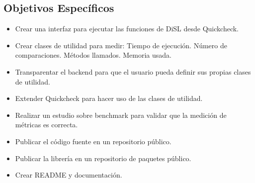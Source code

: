 \subsection*{Objetivos Específicos}\label{sec:obj-e}
\begin{itemize}
\item Crear una interfaz para ejecutar las funciones de DiSL desde Quickcheck.
\item Crear clases de utilidad para medir:
\subitem Tiempo de ejecución.
\subitem Número de comparaciones.
\subitem Métodos llamados.
\subitem Memoria usada.
\item Transparentar el backend para que el usuario pueda definir sus propias
  clases de utilidad.
\item Extender Quickcheck para hacer uso de las clases de utilidad.
\item Realizar un estudio sobre benchmark para validar que la medición de
  métricas es correcta.
\item Publicar el código fuente en un repositorio público.
\item Publicar la librería en un repositorio de paquetes público.
\item Crear README y documentación.
\end{itemize}
